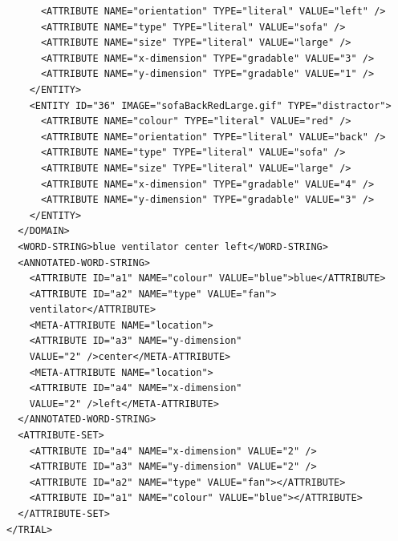 \begin{verbatim}
      <ATTRIBUTE NAME="orientation" TYPE="literal" VALUE="left" />
      <ATTRIBUTE NAME="type" TYPE="literal" VALUE="sofa" />
      <ATTRIBUTE NAME="size" TYPE="literal" VALUE="large" />
      <ATTRIBUTE NAME="x-dimension" TYPE="gradable" VALUE="3" />
      <ATTRIBUTE NAME="y-dimension" TYPE="gradable" VALUE="1" />
    </ENTITY>
    <ENTITY ID="36" IMAGE="sofaBackRedLarge.gif" TYPE="distractor">
      <ATTRIBUTE NAME="colour" TYPE="literal" VALUE="red" />
      <ATTRIBUTE NAME="orientation" TYPE="literal" VALUE="back" />
      <ATTRIBUTE NAME="type" TYPE="literal" VALUE="sofa" />
      <ATTRIBUTE NAME="size" TYPE="literal" VALUE="large" />
      <ATTRIBUTE NAME="x-dimension" TYPE="gradable" VALUE="4" />
      <ATTRIBUTE NAME="y-dimension" TYPE="gradable" VALUE="3" />
    </ENTITY>
  </DOMAIN>
  <WORD-STRING>blue ventilator center left</WORD-STRING>
  <ANNOTATED-WORD-STRING>
    <ATTRIBUTE ID="a1" NAME="colour" VALUE="blue">blue</ATTRIBUTE>
    <ATTRIBUTE ID="a2" NAME="type" VALUE="fan">
    ventilator</ATTRIBUTE>
    <META-ATTRIBUTE NAME="location">
    <ATTRIBUTE ID="a3" NAME="y-dimension"
    VALUE="2" />center</META-ATTRIBUTE>
    <META-ATTRIBUTE NAME="location">
    <ATTRIBUTE ID="a4" NAME="x-dimension"
    VALUE="2" />left</META-ATTRIBUTE>
  </ANNOTATED-WORD-STRING>
  <ATTRIBUTE-SET>
    <ATTRIBUTE ID="a4" NAME="x-dimension" VALUE="2" />
    <ATTRIBUTE ID="a3" NAME="y-dimension" VALUE="2" />
    <ATTRIBUTE ID="a2" NAME="type" VALUE="fan"></ATTRIBUTE>
    <ATTRIBUTE ID="a1" NAME="colour" VALUE="blue"></ATTRIBUTE>
  </ATTRIBUTE-SET>
</TRIAL>
\end{verbatim}


